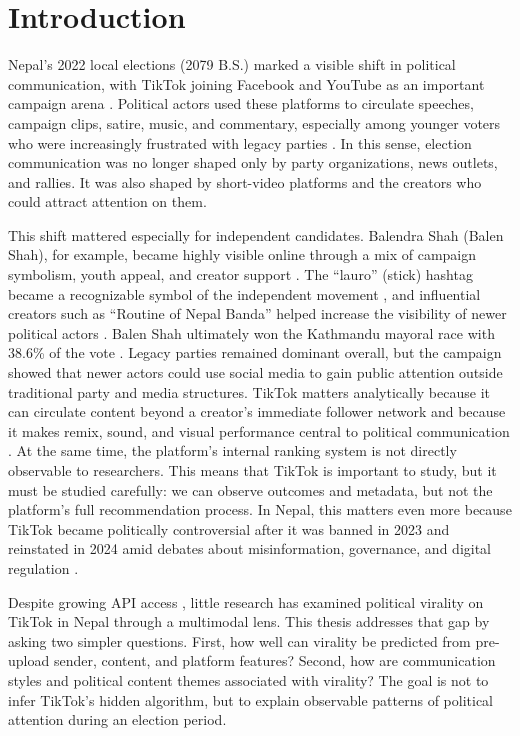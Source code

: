 \documentclass[12pt,a4paper]{report}
\begin{document}
\chapter{Introduction}
Nepal's 2022 local elections (2079 B.S.) marked a visible shift in political communication, with TikTok joining Facebook and YouTube as an important campaign arena \parencite{nepalitimes2025}. Political actors used these platforms to circulate speeches, campaign clips, satire, music, and commentary, especially among younger voters who were increasingly frustrated with legacy parties \parencite{FPExplainers2024, dahal2023influence}. In this sense, election communication was no longer shaped only by party organizations, news outlets, and rallies. It was also shaped by short-video platforms and the creators who could attract attention on them.

This shift mattered especially for independent candidates. Balendra Shah (Balen Shah), for example, became highly visible online through a mix of campaign symbolism, youth appeal, and creator support \parencite{DW2022NepalElections}. The ``lauro'' (stick) hashtag became a recognizable symbol of the independent movement \parencite{AnnapurnaExpress2022}, and influential creators such as ``Routine of Nepal Banda'' helped increase the visibility of newer political actors \parencite{dahal2023influence}. Balen Shah ultimately won the Kathmandu mayoral race with 38.6\% of the vote \parencite{wikipedia2022local}. Legacy parties remained dominant overall, but the campaign showed that newer actors could use social media to gain public attention outside traditional party and media structures.
\newpage
TikTok matters analytically because it can circulate content beyond a creator's immediate follower network and because it makes remix, sound, and visual performance central to political communication \parencite{guinaudeau2022fifteen}. At the same time, the platform's internal ranking system is not directly observable to researchers. This means that TikTok is important to study, but it must be studied carefully: we can observe outcomes and metadata, but not the platform's full recommendation process. In Nepal, this matters even more because TikTok became politically controversial after it was banned in 2023 and reinstated in 2024 amid debates about misinformation, governance, and digital regulation \parencite{lamichhane2024tik, reuters2024tiktok}.

Despite growing API access \parencite{tiktokResearchAPI2025}, little research has examined political virality on TikTok in Nepal through a multimodal lens. This thesis addresses that gap by asking two simpler questions. First, how well can virality be predicted from pre-upload sender, content, and platform features? Second, how are communication styles and political content themes associated with virality? The goal is not to infer TikTok's hidden algorithm, but to explain observable patterns of political attention during an election period.
\end{document}
